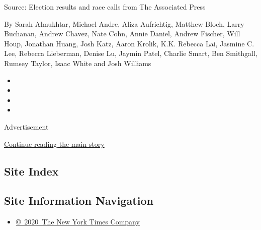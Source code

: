Source: Election results and race calls from The Associated Press

By Sarah Almukhtar, Michael Andre, Aliza Aufrichtig, Matthew Bloch,
Larry Buchanan, Andrew Chavez, Nate Cohn, Annie Daniel, Andrew Fischer,
Will Houp, Jonathan Huang, Josh Katz, Aaron Krolik, K.K. Rebecca Lai,
Jasmine C. Lee, Rebecca Lieberman, Denise Lu, Jaymin Patel, Charlie
Smart, Ben Smithgall, Rumsey Taylor, Isaac White and Josh Williams

\begin{itemize}
\item
\item
\item
\item
\end{itemize}

Advertisement

\protect\hyperlink{after-bottom}{Continue reading the main story}

\hypertarget{site-index}{%
\subsection{Site Index}\label{site-index}}

\hypertarget{site-information-navigation}{%
\subsection{Site Information
Navigation}\label{site-information-navigation}}

\begin{itemize}
\tightlist
\item
  \href{https://help.nytimes3xbfgragh.onion/hc/en-us/articles/115014792127-Copyright-notice}{©~2020~The
  New York Times Company}
\end{itemize}

